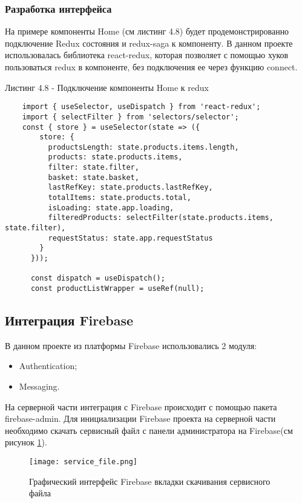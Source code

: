 \subsubsection{Разработка интерфейса}\hfill

На примере компоненты Home (см листинг 4.8) будет продемонстрированно подключение Redux состояния и redux-saga к компоненту.
В данном проекте использовалась библиотека react-redux, которая позволяет с помощью хуков пользоваться redux в компоненте, без подключения ее через функцию connect.

Листинг 4.8 - Подключение компоненты Home к redux
\begin{lstlisting}
    import { useSelector, useDispatch } from 'react-redux';
    import { selectFilter } from 'selectors/selector';
    const { store } = useSelector(state => ({
        store: {
          productsLength: state.products.items.length,
          products: state.products.items,
          filter: state.filter,
          basket: state.basket,
          lastRefKey: state.products.lastRefKey,
          totalItems: state.products.total,
          isLoading: state.app.loading,
          filteredProducts: selectFilter(state.products.items, state.filter),
          requestStatus: state.app.requestStatus
        }
      }));

      const dispatch = useDispatch();
      const productListWrapper = useRef(null);

\end{lstlisting}


\subsection{Интеграция Firebase}
В данном проекте из платформы Firebase использовались 2 модуля:
\begin{itemize}
    \item Authentication;
    \item Messaging.
\end{itemize}

На серверной части интеграция с Firebase происходит с помощью пакета firebase-admin.
Для инициализации Firebase проекта на серверной части необходимо скачать сервисный файл с панели администратора на Firebase(см рисунок \ref{fire:admin}).

\begin{figure}[ht]
    \centering
    \texttt{[image: service\_file.png]}
    \caption{ Графический интерфейс Firebase вкладки скачивания сервисного файла }
    \label{fire:admin}
\end{figure}

